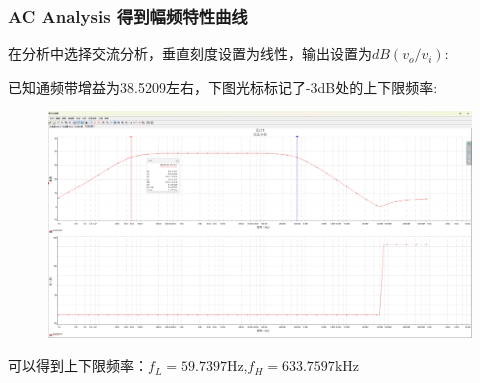 \documentclass[a4paper,11pt,UTF8]{article}
\numberwithin{equation}{subsection}
\begin{document}
\subsubsection{AC Analysis 得到幅频特性曲线}
在分析中选择交流分析，垂直刻度设置为线性，输出设置为$dB(v_o/v_i)$:
\begin{figure}[H]
\end{figure}
已知通频带增益为38.5209左右，下图光标标记了-3dB处的上下限频率:
\begin{figure}[H]
	\centering
	\includegraphics[width=1\textwidth]{6.1.3_3.PNG}	
\end{figure}
可以得到上下限频率：$f_L=59.7397$Hz,$f_H=633.7597$kHz
\end{document}

